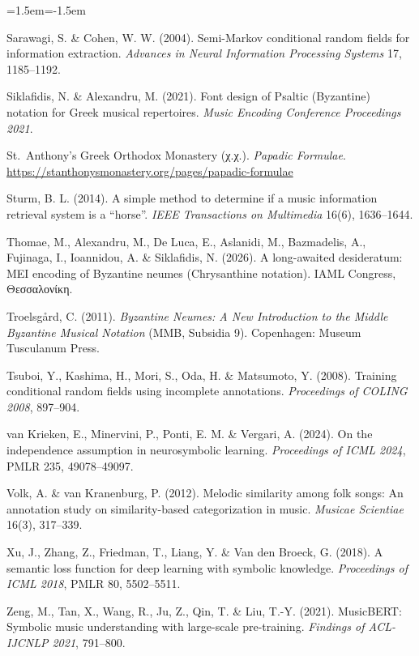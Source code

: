 \documentclass[11pt,a4paper]{article}
\begin{document}
\begin{list}{}{\leftmargin=1.5em\itemindent=-1.5em\itemsep=1pt}
\item Sarawagi, S. \& Cohen, W. W. (2004). Semi-Markov conditional random fields for information extraction. \emph{Advances in Neural Information Processing Systems} 17, 1185--1192.
\item Siklafidis, N. \& Alexandru, M. (2021). Font design of Psaltic (Byzantine) notation for Greek musical repertoires. \emph{Music Encoding Conference Proceedings 2021}.
\item St.~Anthony's Greek Orthodox Monastery (χ.χ.). \emph{Papadic Formulae}. \url{https://stanthonysmonastery.org/pages/papadic-formulae}
\item Sturm, B. L. (2014). A simple method to determine if a music information retrieval system is a “horse”. \emph{IEEE Transactions on Multimedia} 16(6), 1636--1644.
\item Thomae, M., Alexandru, M., De Luca, E., Aslanidi, M., Bazmadelis, A., Fujinaga, I., Ioannidou, A. \& Siklafidis, N. (2026). A long-awaited desideratum: MEI encoding of Byzantine neumes (Chrysanthine notation). IAML Congress, Θεσσαλονίκη.
\item Troelsgård, C. (2011). \emph{Byzantine Neumes: A New Introduction to the Middle Byzantine Musical Notation} (MMB, Subsidia 9). Copenhagen: Museum Tusculanum Press.
\item Tsuboi, Y., Kashima, H., Mori, S., Oda, H. \& Matsumoto, Y. (2008). Training conditional random fields using incomplete annotations. \emph{Proceedings of COLING 2008}, 897--904.
\item van Krieken, E., Minervini, P., Ponti, E. M. \& Vergari, A. (2024). On the independence assumption in neurosymbolic learning. \emph{Proceedings of ICML 2024}, PMLR 235, 49078--49097.
\item Volk, A. \& van Kranenburg, P. (2012). Melodic similarity among folk songs: An annotation study on similarity-based categorization in music. \emph{Musicae Scientiae} 16(3), 317--339.
\item Xu, J., Zhang, Z., Friedman, T., Liang, Y. \& Van den Broeck, G. (2018). A semantic loss function for deep learning with symbolic knowledge. \emph{Proceedings of ICML 2018}, PMLR 80, 5502--5511.
\item Zeng, M., Tan, X., Wang, R., Ju, Z., Qin, T. \& Liu, T.-Y. (2021). MusicBERT: Symbolic music understanding with large-scale pre-training. \emph{Findings of ACL-IJCNLP 2021}, 791--800.
\end{list}
\end{document}
